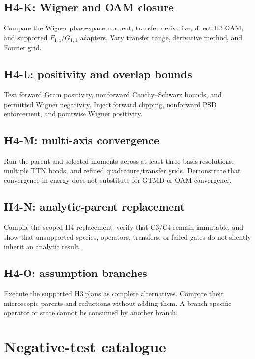 \documentclass[11pt]{article}
\begin{document}
\subsection{H4-K: Wigner and OAM closure}

Compare the Wigner phase-space moment, transfer derivative, direct H3 OAM,
and supported \(F_{1,4}\)/\(G_{1,1}\) adapters.  Vary transfer range,
derivative method, and Fourier grid.

\subsection{H4-L: positivity and overlap bounds}

Test forward Gram positivity, nonforward Cauchy--Schwarz bounds, and permitted
Wigner negativity.  Inject forward clipping, nonforward PSD enforcement, and
pointwise Wigner positivity.

\subsection{H4-M: multi-axis convergence}

Run the parent and selected moments across at least three basis resolutions,
multiple TTN bonds, and refined quadrature/transfer grids.  Demonstrate that
convergence in energy does not substitute for GTMD or OAM convergence.

\subsection{H4-N: analytic-parent replacement}

Compile the scoped H4 replacement, verify that C3/C4 remain immutable, and
show that unsupported species, operators, transfers, or failed gates do not
silently inherit an analytic result.

\subsection{H4-O: assumption branches}

Execute the supported H3 plans as complete alternatives.  Compare their
microscopic parents and reductions without adding them.  A branch-specific
operator or state cannot be consumed by another branch.

\section{Negative-test catalogue}
\label{sec:negative}
\end{document}
